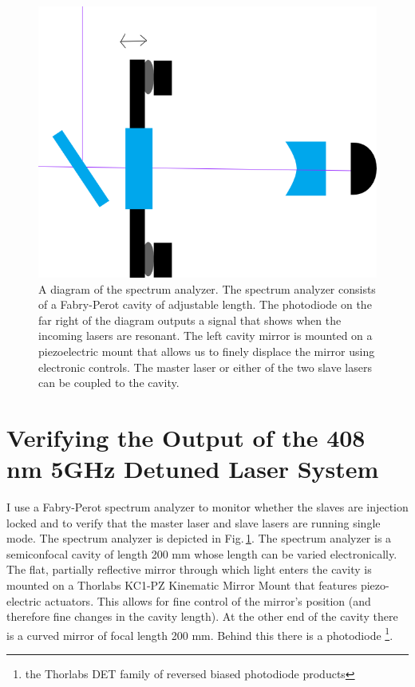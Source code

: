 \begin{figure}
    \centerline{\includegraphics[totalheight=0.3\textheight ]{spectrumAnalyzer}}
    \caption[]{\label{fig:spectrumAnalyzer}
    A diagram of the spectrum analyzer. The spectrum analyzer consists of a Fabry-Perot cavity of adjustable length. The photodiode on the far right of the diagram outputs a signal that shows when the incoming lasers are resonant. The left cavity mirror is mounted on a piezoelectric mount that allows us to finely displace the mirror using electronic controls. The master laser or either of the two slave lasers can be coupled to the cavity.
}
\end{figure} 

\section{Verifying the Output of the 408 nm 5GHz Detuned Laser System}
I use a Fabry-Perot spectrum analyzer to monitor whether the slaves are injection locked and to verify that the master laser and slave lasers are running single mode. The spectrum analyzer is depicted in Fig.\,\ref{fig:spectrumAnalyzer}. 
The spectrum analyzer is a semiconfocal cavity of length 200 mm whose length can be varied electronically. The flat, partially reflective mirror through which light enters the cavity is mounted on a Thorlabs KC1-PZ Kinematic Mirror Mount that features piezo-electric actuators. This allows for fine control of the mirror's position (and therefore fine changes in the cavity length). At the other end of the cavity there is a curved mirror of focal length 200 mm. Behind this there is a photodiode \footnote{the Thorlabs DET family of reversed biased photodiode products}.

